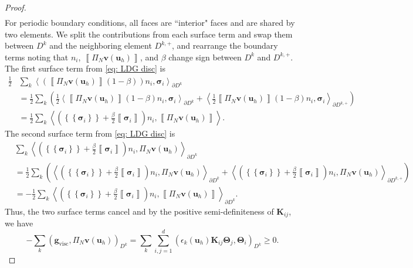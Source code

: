 \documentclass{elsarticle}
\theoremstyle{definition}
\theoremstyle{plain}
\theoremstyle{plain}
\newcommand{\LRp}[1]{\left( #1 \right)} %
\newcommand{\LRc}[1]{\left\{ #1 \right\}} %
\newcommand{\jump}[1] {\ensuremath{\left\llbracket#1\right\rrbracket}} %
\newcommand{\avg}[1] {\ensuremath{\LRc{\!\!\LRc{#1}\!\!}}}
\newcommand{\ProjV}{\Pi_N\bm{v}(\bm{u}_h)}
\newcommand{\refone}[1]{{\color{red}#1}}
\newcommand{\reftwo}[1]{{\color{blue}#1}}
\renewcommand{\refone}[1]{#1}
\renewcommand{\reftwo}[1]{#1}
\begin{document}
\begin{proof}
\begin{equation}
\begin{aligned}
    \end{aligned}
    \end{equation}
For periodic boundary conditions, all faces are ``interior" faces \refone{and are shared by} two elements. We split the contributions from each surface term and swap them between $D^k$ and the neighboring element $D^{k,+}$, and rearrange the boundary terms noting that $n_i$, $\jump{\reftwo{\ProjV}}$, and $\beta$ change sign between $D^k$ and $D^{k,+}$.
The first surface term from \eqref{eq: LDG disc} is
\begin{equation*}
\begin{aligned}
    \frac{1}{2}&\sum_k\left\langle \left(\jump{\reftwo{\Pi_N\bm{v}(\bm{u}_{h})}}(1-\beta)\right)n_i, \bm{\sigma}_i \right\rangle_{\partial D^k}  \\ 
    & = \frac{1}{2} \sum_k\left(\frac{1}{2}\left\langle \jump{\reftwo{\ProjV}}(1 - \beta)n_i,\bm{\sigma}_i \right\rangle_{\partial D^k} + \left\langle \frac{1}{2}\jump{\reftwo{\ProjV}}(1-\beta)n_i,\bm{\sigma}_i \right\rangle_{\partial D^{k,+}}\right)\\
    & = \frac{1}{2} \sum_{k} \left\langle \left(\avg{\bm{\sigma}_i} + \frac{\beta}{2}\jump{ \bm{\sigma}_i}\right)n_i,\jump{ \reftwo{\ProjV}}\right\rangle \refone{.}
\end{aligned}
\end{equation*}
The second surface term from \eqref{eq: LDG disc} is
\begin{equation*}
    \begin{aligned}
        & \sum_k \left\langle \left(\avg{\bm{\sigma}_i} + \frac{\beta}{2}\jump{\bm{\sigma}_i}\right)n_i, \reftwo{\ProjV} \right\rangle_{\partial D^k}\\
        &= \frac{1}{2} \sum_k \left(\left\langle \left(\avg{\bm{\sigma}_i} + \frac{\beta}{2}\jump{\bm{\sigma}_i}\right)n_i,\reftwo{\ProjV}\right\rangle_{\partial D^k} + \left\langle \left(\avg{\bm{\sigma}_i} + \frac{\beta}{2}\jump{\bm{\sigma}_i}\right)n_i,\reftwo{\ProjV}\right\rangle_{\partial D^{k,+}}\right)\\
        &= -\frac{1}{2} \sum_k \left\langle \left(\avg{\bm{\sigma}_i} + \frac{\beta}{2}\jump{\bm{\sigma}_i}\right)n_i,\refone{\jump{\reftwo{\ProjV}}}\right\rangle_{\partial D^k}.
    \end{aligned}
\end{equation*}
Thus, the two surface terms cancel and by the positive semi-definiteness of $\bm{K}_{ij}$, we have
\begin{equation}\label{eq: LDG gvisc bound}
-\sum_{k}\LRp{\bm{g}_{\text{visc}}, \reftwo{\ProjV}}_{D^k} = \sum_k \sum_{i,j = 1}^{\refone{d}}\LRp{\epsilon_k(\bm{u}_h)\bm{K}_{ij} \bm{\Theta}_j ,\bm{\Theta}_i}_{D^k} \reftwo{\geq} 0.
\end{equation}
\end{proof} 
\end{document}
